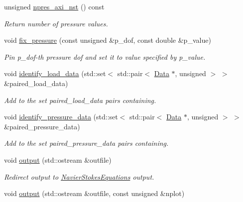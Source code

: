 \begin{DoxyCompactItemize}
unsigned \hyperlink{classoomph_1_1GeneralisedNewtonianAxisymmetricTTaylorHoodElement_adb127de036210e35b09096c7df88b4d5}{npres\+\_\+axi\+\_\+nst} () const
\begin{DoxyCompactList}\small\item\em Return number of pressure values. \end{DoxyCompactList}\item 
void \hyperlink{classoomph_1_1GeneralisedNewtonianAxisymmetricTTaylorHoodElement_a800da4469b80723056d016b0e5ac4815}{fix\+\_\+pressure} (const unsigned \&p\+\_\+dof, const double \&p\+\_\+value)
\begin{DoxyCompactList}\small\item\em Pin p\+\_\+dof-\/th pressure dof and set it to value specified by p\+\_\+value. \end{DoxyCompactList}\item 
void \hyperlink{classoomph_1_1GeneralisedNewtonianAxisymmetricTTaylorHoodElement_a2f7a2becd038eb8be0f69f1b3e2ce8c3}{identify\+\_\+load\+\_\+data} (std\+::set$<$ std\+::pair$<$ \hyperlink{classoomph_1_1Data}{Data} $\ast$, unsigned $>$ $>$ \&paired\+\_\+load\+\_\+data)
\begin{DoxyCompactList}\small\item\em Add to the set {\ttfamily paired\+\_\+load\+\_\+data} pairs containing. \end{DoxyCompactList}\item 
void \hyperlink{classoomph_1_1GeneralisedNewtonianAxisymmetricTTaylorHoodElement_aa33e3b4641824ea7516c5e98beeb9e1f}{identify\+\_\+pressure\+\_\+data} (std\+::set$<$ std\+::pair$<$ \hyperlink{classoomph_1_1Data}{Data} $\ast$, unsigned $>$ $>$ \&paired\+\_\+pressure\+\_\+data)
\begin{DoxyCompactList}\small\item\em Add to the set {\ttfamily paired\+\_\+pressure\+\_\+data} pairs containing. \end{DoxyCompactList}\item 
void \hyperlink{classoomph_1_1GeneralisedNewtonianAxisymmetricTTaylorHoodElement_a27e5fdda8d9499f20b99f82443d37b78}{output} (std\+::ostream \&outfile)
\begin{DoxyCompactList}\small\item\em Redirect output to \hyperlink{classoomph_1_1NavierStokesEquations}{Navier\+Stokes\+Equations} output. \end{DoxyCompactList}\item 
void \hyperlink{classoomph_1_1GeneralisedNewtonianAxisymmetricTTaylorHoodElement_a9dbf98876164e1a9443a01fb3b0d284b}{output} (std\+::ostream \&outfile, const unsigned \&nplot)

\end{DoxyCompactItemize}
